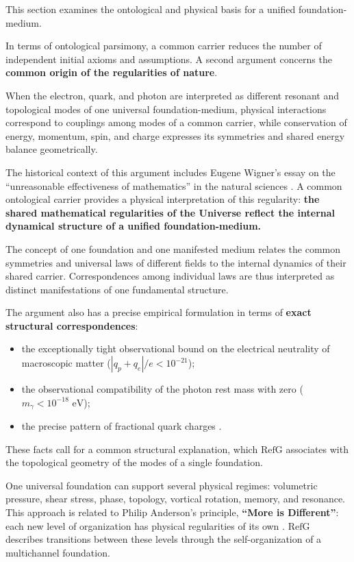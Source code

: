 \documentclass[11pt,a4paper]{article}
\newcommand{\RefG}{\mathrm{RefG}}
\begin{document}
This section examines the ontological and physical basis for a unified foundation-medium.

In terms of ontological parsimony, a common carrier reduces the number of independent initial axioms and assumptions. A second argument concerns the \textbf{common origin of the regularities of nature}.

When the electron, quark, and photon are interpreted as different resonant and topological modes of one universal foundation-medium, physical interactions correspond to couplings among modes of a common carrier, while conservation of energy, momentum, spin, and charge expresses its symmetries and shared energy balance geometrically.

The historical context of this argument includes Eugene Wigner's essay on the ``unreasonable effectiveness of mathematics'' in the natural sciences \citep{wigner1960}. A common ontological carrier provides a physical interpretation of this regularity: \textbf{the shared mathematical regularities of the Universe reflect the internal dynamical structure of a unified foundation-medium.}

The concept of one foundation and one manifested medium relates the common symmetries and universal laws of different fields to the internal dynamics of their shared carrier. Correspondences among individual laws are thus interpreted as distinct manifestations of one fundamental structure.

The argument also has a precise empirical formulation in terms of \textbf{exact structural correspondences}:
\begin{itemize}
\item the exceptionally tight observational bound on the electrical neutrality of macroscopic matter ($|q_p+q_e|/e<10^{-21}$);
\item the observational compatibility of the photon rest mass with zero ($m_\gamma<10^{-18}\text{ eV}$);
\item the precise pattern of fractional quark charges \citep{navas2024}.
\end{itemize}

These facts call for a common structural explanation, which $\RefG$ associates with the topological geometry of the modes of a single foundation.

One universal foundation can support several physical regimes: volumetric pressure, shear stress, phase, topology, vortical rotation, memory, and resonance. This approach is related to Philip Anderson's principle, \textbf{``More is Different''}: each new level of organization has physical regularities of its own \citep{anderson1972}. $\RefG$ describes transitions between these levels through the self-organization of a multichannel foundation.
\end{document}
